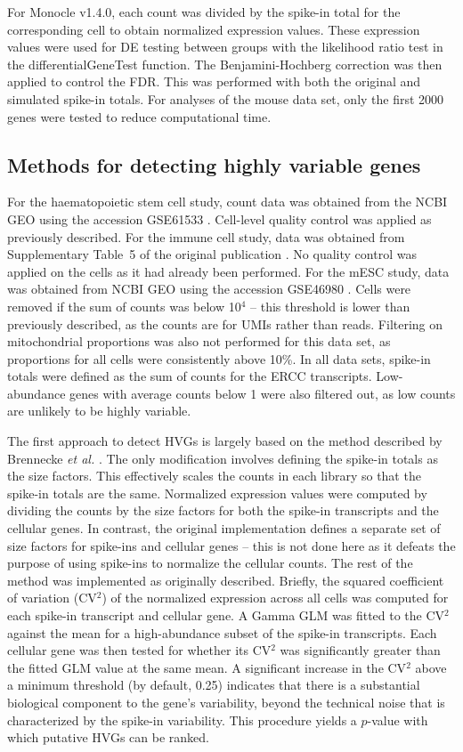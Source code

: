 \documentclass{article}
\begin{document}
For Monocle v1.4.0, each count was divided by the spike-in total for the corresponding cell to obtain normalized expression values.
These expression values were used for DE testing between groups with the likelihood ratio test in the differentialGeneTest function.
The Benjamini-Hochberg correction was then applied to control the FDR.
This was performed with both the original and simulated spike-in totals.
For analyses of the mouse data set, only the first 2000 genes were tested to reduce computational time.

\subsection{Methods for detecting highly variable genes}
For the haematopoietic stem cell study, count data was obtained from the NCBI GEO using the accession GSE61533 \cite{wilson2015combined}.
Cell-level quality control was applied as previously described.
For the immune cell study, data was obtained from Supplementary Table~5 of the original publication \cite{brennecke2013accounting}.
No quality control was applied on the cells as it had already been performed.
For the mESC study, data was obtained from NCBI GEO using the accession GSE46980 \cite{islam2014quantitative}.
Cells were removed if the sum of counts was below 10$^4$ -- this threshold is lower than previously described, as the counts are for UMIs rather than reads.
Filtering on mitochondrial proportions was also not performed for this data set, as proportions for all cells were consistently above 10\%.
In all data sets, spike-in totals were defined as the sum of counts for the ERCC transcripts.
Low-abundance genes with average counts below 1 were also filtered out, as low counts are unlikely to be highly variable.

The first approach to detect HVGs is largely based on the method described by Brennecke \textit{et al.} \cite{brennecke2013accounting}.
The only modification involves defining the spike-in totals as the size factors.
This effectively scales the counts in each library so that the spike-in totals are the same.
Normalized expression values were computed by dividing the counts by the size factors for both the spike-in transcripts and the cellular genes.
In contrast, the original implementation defines a separate set of size factors for spike-ins and cellular genes -- this is not done here as it defeats the purpose of using spike-ins to normalize the cellular counts.
The rest of the method was implemented as originally described.
Briefly, the squared coefficient of variation (CV$^2$) of the normalized expression across all cells was computed for each spike-in transcript and cellular gene.
A Gamma GLM was fitted to the CV$^2$ against the mean for a high-abundance subset of the spike-in transcripts.
Each cellular gene was then tested for whether its CV$^2$ was significantly greater than the fitted GLM value at the same mean.
A significant increase in the CV$^2$ above a minimum threshold (by default, 0.25) indicates that there is a substantial biological component to the gene's variability, beyond the technical noise that is characterized by the spike-in variability.
This procedure yields a $p$-value with which putative HVGs can be ranked.
\end{document}
